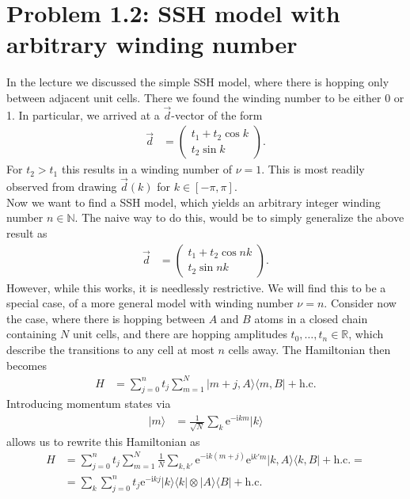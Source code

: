 \documentclass[english, parskip=full]{scrartcl}
\newcommand{\oper}{}
\newcommand{\tecxt}{}
\newcommand{\Ket}{}
\renewcommand{\i}{\text{i}}
\newcommand{\e}{\text{e}}
\begin{document}
\section*{Problem 1.2: SSH model with arbitrary winding number}
In the lecture we discussed the simple SSH model, where there is hopping only between adjacent unit cells.
There we found the winding number to be either 0 or 1.
In particular, we arrived at a $\vec{d}$-vector of the form
\begin{align}
\vec{d}&=\begin{pmatrix}
t_1+t_2\cos k \\ t_2\sin k
\end{pmatrix}.
\end{align}
For $t_2>t_1$ this results in a winding number of $\nu=1$.
This is most readily observed from drawing $\vec{d}(k)$ for $k\in[-\pi,\pi]$.
\\
Now we want to find a SSH model, which yields an arbitrary integer winding number $n\in\mathbb{N}$.
The naive way to do this, would be to simply generalize the above result as
\begin{align}
\vec{d}&=\begin{pmatrix}
t_1+t_2\cos nk \\ t_2\sin nk
\end{pmatrix}.
\end{align}
However, while this works, it is needlessly restrictive. 
We will find this to be a special case, of a more general model with winding number $\nu=n$.
Consider now the case, where there is hopping between $A$ and $B$ atoms in a closed chain containing $N$ unit cells, and there are hopping amplitudes $t_0,\dots,t_n\in\mathbb{R}$, which describe the transitions to any cell at most $n$ cells away.
The Hamiltonian then becomes
\begin{align}
H&=\sum_{j=0}^n t_j\sum_{m=1}^{N}\oper | m+j,A \rangle\langle m,B |+\tecxt\text{h.c.}
\end{align}
Introducing momentum states via
\begin{align}
\Ket | m \rangle&=\frac{1}{\sqrt{N}}\sum_k\e^{-\i km}\Ket | k \rangle
\end{align}
allows us to rewrite this Hamiltonian as
\begin{align}
H&=\sum_{j=0}^n t_j\sum_{m=1}^{N}\frac{1}{N}\sum_{k,k'}\oper \e^{-\i k(m+j)}\e^{\i k'm}| k,A \rangle\langle k,B |+\tecxt\text{h.c.}=\\
&=\sum_k\sum_{j=0}^n t_j\oper \e^{-\i kj}| k \rangle\langle k |\otimes\oper | A \rangle\langle B |+\tecxt\text{h.c.}
\end{align}
\end{document}
